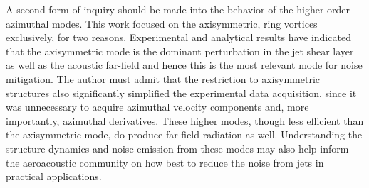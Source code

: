 A second form of inquiry should be made into the behavior of the higher-order azimuthal modes.
This work focused on the axisymmetric, ring vortices exclusively, for two reasons.
Experimental and analytical results have indicated that the axisymmetric mode is the dominant perturbation in the jet shear layer as well as the acoustic far-field and hence this is the most relevant mode for noise mitigation.
The author must admit that the restriction to axisymmetric structures also significantly simplified the experimental data acquisition, since it was unnecessary to acquire azimuthal velocity components and, more importantly, azimuthal derivatives.
These higher modes, though less efficient than the axisymmetric mode, do produce far-field radiation as well.
Understanding the structure dynamics and noise emission from these modes may also help inform the aeroacoustic community on how best to reduce the noise from jets in practical applications.